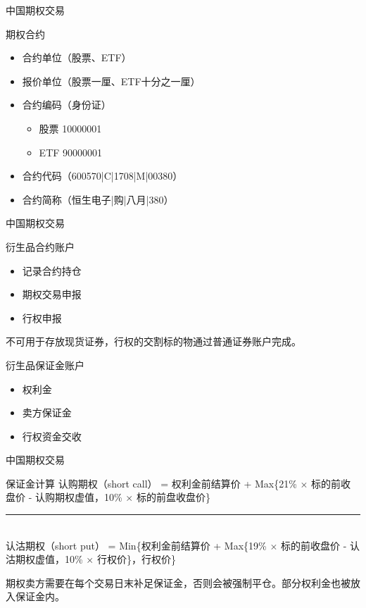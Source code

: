 \documentclass[12pt]{ctexbeamer}	%
\begin{document}
\begin{frame}{中国期权交易}
  \begin{block}{期权合约}
    \begin{itemize}
      \item 合约单位（股票、ETF）
      \item 报价单位（股票一厘、ETF十分之一厘）
      \item 合约编码（身份证）
      \begin{itemize}
        \item 股票 10000001
        \item ETF 90000001
      \end{itemize}
      \item 合约代码（600570|C|1708|M|00380）
      \item 合约简称（恒生电子|购|八月|380）
    \end{itemize}
  \end{block}
\end{frame}

\begin{frame}{中国期权交易}
  \begin{block}{衍生品合约账户}
    \begin{itemize}
      \item 记录合约持仓
      \item 期权交易申报
      \item 行权申报
    \end{itemize}
    不可用于存放现货证券，行权的交割标的物通过普通证券账户完成。
  \end{block}
  \begin{block}{衍生品保证金账户}
    \begin{itemize}
      \item 权利金
      \item 卖方保证金
      \item 行权资金交收
    \end{itemize}
  \end{block}
\end{frame}

\begin{frame}{中国期权交易}
  \begin{block}{保证金计算}
    认购期权（short call） = 权利金前结算价 + Max\{21\% $\times$ 标的前收盘价 - 认购期权虚值，10\% $\times$ 标的前盘收盘价\} \\
    \noindent\rule{4cm}{0.4pt}\\
    认沽期权（short put） = Min\{权利金前结算价 + Max\{19\% $\times$ 标的前收盘价 - 认沽期权虚值，10\% $\times$ 行权价\}，行权价\}\\
  \end{block}
  期权卖方需要在每个交易日末补足保证金，否则会被强制平仓。部分权利金也被放入保证金内。
\end{frame}
\end{document}
